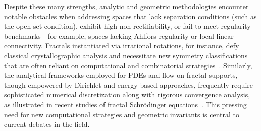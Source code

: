 \documentclass[sigconf]{acmart}
\begin{document}
Despite these many strengths, analytic and geometric methodologies encounter notable obstacles when addressing spaces that lack separation conditions (such as the open set condition), exhibit high non-rectifiability, or fail to meet regularity benchmarks---for example, spaces lacking Ahlfors regularity or local linear connectivity. Fractals instantiated via irrational rotations, for instance, defy classical crystallographic analysis and necessitate new symmetry classifications that are often reliant on computational and combinatorial strategies~\cite{ref20}. Similarly, the analytical frameworks employed for PDEs and flow on fractal supports, though empowered by Dirichlet and energy-based approaches, frequently require sophisticated numerical discretization along with rigorous convergence analysis, as illustrated in recent studies of fractal Schrödinger equations~\cite{ref51}. This pressing need for new computational strategies and geometric invariants is central to current debates in the field.
\end{document}
